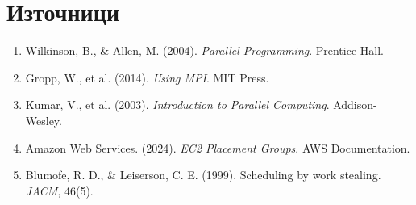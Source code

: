 \documentclass[12pt,a4paper]{article}
\begin{document}
\section*{Източници}

\begin{enumerate}
    \item Wilkinson, B., \& Allen, M. (2004). \textit{Parallel Programming}. Prentice Hall.
    \item Gropp, W., et al. (2014). \textit{Using MPI}. MIT Press.
    \item Kumar, V., et al. (2003). \textit{Introduction to Parallel Computing}. Addison-Wesley.
    \item Amazon Web Services. (2024). \textit{EC2 Placement Groups}. AWS Documentation.
    \item Blumofe, R. D., \& Leiserson, C. E. (1999). Scheduling by work stealing. \textit{JACM}, 46(5).
\end{enumerate}
\end{document}
